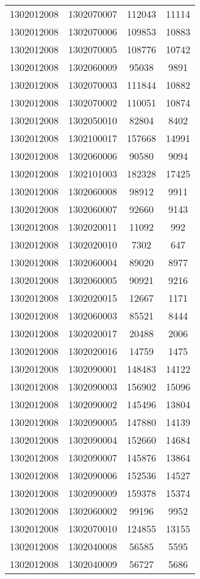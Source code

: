 \begin{longtable}{llcc}
1302012008 & 1302070007 & 112043 & 11114\\
1302012008 & 1302070006 & 109853 & 10883\\
1302012008 & 1302070005 & 108776 & 10742\\
1302012008 & 1302060009 & 95038 & 9891\\
1302012008 & 1302070003 & 111844 & 10882\\
1302012008 & 1302070002 & 110051 & 10874\\
1302012008 & 1302050010 & 82804 & 8402\\
1302012008 & 1302100017 & 157668 & 14991\\
1302012008 & 1302060006 & 90580 & 9094\\
1302012008 & 1302101003 & 182328 & 17425\\
1302012008 & 1302060008 & 98912 & 9911\\
1302012008 & 1302060007 & 92660 & 9143\\
1302012008 & 1302020011 & 11092 & 992\\
1302012008 & 1302020010 & 7302 & 647\\
1302012008 & 1302060004 & 89020 & 8977\\
1302012008 & 1302060005 & 90921 & 9216\\
1302012008 & 1302020015 & 12667 & 1171\\
1302012008 & 1302060003 & 85521 & 8444\\
1302012008 & 1302020017 & 20488 & 2006\\
1302012008 & 1302020016 & 14759 & 1475\\
1302012008 & 1302090001 & 148483 & 14122\\
1302012008 & 1302090003 & 156902 & 15096\\
1302012008 & 1302090002 & 145496 & 13804\\
1302012008 & 1302090005 & 147880 & 14139\\
1302012008 & 1302090004 & 152660 & 14684\\
1302012008 & 1302090007 & 145876 & 13864\\
1302012008 & 1302090006 & 152536 & 14527\\
1302012008 & 1302090009 & 159378 & 15374\\
1302012008 & 1302060002 & 99196 & 9952\\
1302012008 & 1302070010 & 124855 & 13155\\
1302012008 & 1302040008 & 56585 & 5595\\
1302012008 & 1302040009 & 56727 & 5686\\

\end{longtable}
